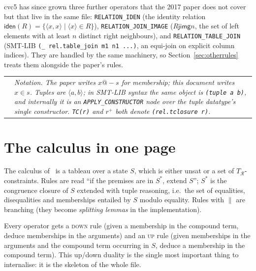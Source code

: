 \documentclass[11pt,a4paper]{article}
\makeatletter
\newcommand{\code}[1]{\texttt{\small #1}}
\newcommand{\tup}[1]{\langle #1 \rangle}
\newcommand{\tc}[1]{{#1}^{+}}
\newcommand{\TR}{T_{\mathcal{R}}}
\theoremstyle{definition}
\newenvironment{sidenote}
  {\par\medskip\noindent\begin{tabular}{@{}p{0.02\textwidth}@{\hspace{4pt}}p{0.93\textwidth}@{}}
   \raisebox{-1pt}{\color{hl}\Large$\vartriangleright$} &\itshape}
  {\end{tabular}\par\medskip}
\makeatother
\begin{document}
\noindent
cvc5 has since grown three further operators that the 2017 paper does not
cover but that live in the same file: \code{RELATION\_IDEN} (the identity
relation $\mathsf{iden}(R)=\{\tup{x,x}\mid \tup{x}\in R\}$),
\code{RELATION\_JOIN\_IMAGE} ($R \mathbin{\mathsf{jimg}} n$, the set of
left elements with at least $n$ distinct right neighbours), and
\code{RELATION\_TABLE\_JOIN} (SMT-LIB \code{(\_ rel.table\_join m1 n1 ...)}, an equi-join on explicit column indices). They are handled by the same machinery, so
Section~\ref{sec:otherrules} treats them alongside the paper's rules.

\begin{sidenote}
Notation. The paper writes $x \mathbin{@\!\!-} s$ for membership; this document
writes $x \in s$. Tuples are $\tup{a,b}$; in SMT-LIB syntax the same object is
\code{(tuple a b)}, and internally it is an \code{APPLY\_CONSTRUCTOR} node over
the tuple datatype's single constructor. \code{TC(r)} and $\tc{r}$ both denote
\code{(rel.tclosure r)}.
\end{sidenote}

\section{The calculus in one page}\label{sec:calculus}

The calculus of~\cite{MRT17} is a tableau over a state $S$, which is either
\textsf{unsat} or a set of $\TR$-constraints. Rules are read
``if the premises are in $S^*$, extend $S$''; $S^*$ is the congruence closure of
$S$ extended with tuple reasoning, i.e.\ the set of equalities, disequalities and
memberships entailed by $S$ modulo equality. Rules with $\parallel$ are
branching (they become \emph{splitting lemmas} in the implementation).

Every operator gets a \textsc{down} rule (given a membership in the compound
term, deduce memberships in the arguments) and an \textsc{up} rule (given
memberships in the arguments and the compound term occurring in $S$, deduce a
membership in the compound term). This up/down duality is the single most
important thing to internalise: it is the skeleton of the whole file.
\end{document}
